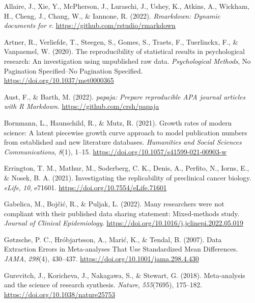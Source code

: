\documentclass[
  ,apa7,floatsintext]{apa6}
\newlength{\cslhangindent}
\newlength{\cslentryspacingunit} %
\newenvironment{CSLReferences}[2] %
 {%
  \setlength{\parindent}{0pt}
  \ifodd #1
  \let\oldpar\par
  \def\par{\hangindent=\cslhangindent\oldpar}
  \fi
  \setlength{\parskip}{#2\cslentryspacingunit}
 }%
 {}
\begin{document}
\hypertarget{refs}{}
\begin{CSLReferences}{1}{0}
\leavevmode{}%
Allaire, J., Xie, Y., McPherson, J., Luraschi, J., Ushey, K., Atkins, A., Wickham, H., Cheng, J., Chang, W., \& Iannone, R. (2022). \emph{Rmarkdown: Dynamic documents for r}. \url{https://github.com/rstudio/rmarkdown}

\leavevmode{}%
Artner, R., Verliefde, T., Steegen, S., Gomes, S., Traets, F., Tuerlinckx, F., \& Vanpaemel, W. (2020). The reproducibility of statistical results in psychological research: {An} investigation using unpublished raw data. \emph{Psychological Methods}, No Pagination Specified--No Pagination Specified. \url{https://doi.org/10.1037/met0000365}

\leavevmode{}%
Aust, F., \& Barth, M. (2022). \emph{{papaja}: {Prepare} reproducible {APA} journal articles with {R Markdown}}. \url{https://github.com/crsh/papaja}

\leavevmode{}%
Bornmann, L., Haunschild, R., \& Mutz, R. (2021). Growth rates of modern science: A latent piecewise growth curve approach to model publication numbers from established and new literature databases. \emph{Humanities and Social Sciences Communications}, \emph{8}(1), 1--15. \url{https://doi.org/10.1057/s41599-021-00903-w}

\leavevmode{}%
Errington, T. M., Mathur, M., Soderberg, C. K., Denis, A., Perfito, N., Iorns, E., \& Nosek, B. A. (2021). Investigating the replicability of preclinical cancer biology. \emph{eLife}, \emph{10}, e71601. \url{https://doi.org/10.7554/eLife.71601}

\leavevmode{}%
Gabelica, M., Bojčić, R., \& Puljak, L. (2022). Many researchers were not compliant with their published data sharing statement: Mixed-methods study. \emph{Journal of Clinical Epidemiology}. \url{https://doi.org/10.1016/j.jclinepi.2022.05.019}

\leavevmode{}%
Gøtzsche, P. C., Hróbjartsson, A., Marić, K., \& Tendal, B. (2007). Data {Extraction Errors} in {Meta-analyses That Use Standardized Mean Differences}. \emph{JAMA}, \emph{298}(4), 430--437. \url{https://doi.org/10.1001/jama.298.4.430}

\leavevmode{}%
Gurevitch, J., Koricheva, J., Nakagawa, S., \& Stewart, G. (2018). Meta-analysis and the science of research synthesis. \emph{Nature}, \emph{555}(7695), 175--182. \url{https://doi.org/10.1038/nature25753}


\end{CSLReferences}
\end{document}
